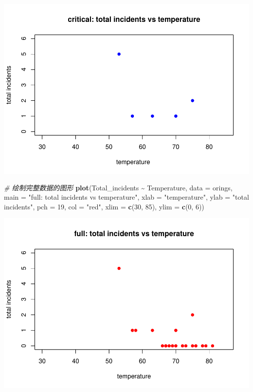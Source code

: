 \documentclass[
]{article}
\newenvironment{Shaded}{\begin{snugshade}}{\end{snugshade}}
\newcommand{\AttributeTok}[1]{\textcolor[rgb]{0.13,0.29,0.53}{#1}}
\newcommand{\CommentTok}[1]{\textcolor[rgb]{0.56,0.35,0.01}{\textit{#1}}}
\newcommand{\DecValTok}[1]{\textcolor[rgb]{0.00,0.00,0.81}{#1}}
\newcommand{\FunctionTok}[1]{\textcolor[rgb]{0.13,0.29,0.53}{\textbf{#1}}}
\newcommand{\NormalTok}[1]{#1}
\newcommand{\SpecialCharTok}[1]{\textcolor[rgb]{0.81,0.36,0.00}{\textbf{#1}}}
\newcommand{\StringTok}[1]{\textcolor[rgb]{0.31,0.60,0.02}{#1}}
\begin{document}
\includegraphics{3220103606-homework1_files/figure-latex/unnamed-chunk-12-1.pdf}

\begin{Shaded}
\begin{Highlighting}[]
\CommentTok{\# 绘制完整数据的图形}
\FunctionTok{plot}\NormalTok{(Total\_incidents }\SpecialCharTok{\textasciitilde{}}\NormalTok{ Temperature, }
     \AttributeTok{data =}\NormalTok{ orings,}
     \AttributeTok{main =} \StringTok{"full: total incidents vs temperature"}\NormalTok{,}
     \AttributeTok{xlab =} \StringTok{"temperature"}\NormalTok{, }
     \AttributeTok{ylab =} \StringTok{"total incidents"}\NormalTok{,}
     \AttributeTok{pch =} \DecValTok{19}\NormalTok{, }\AttributeTok{col =} \StringTok{"red"}\NormalTok{,}
     \AttributeTok{xlim =} \FunctionTok{c}\NormalTok{(}\DecValTok{30}\NormalTok{, }\DecValTok{85}\NormalTok{), }\AttributeTok{ylim =} \FunctionTok{c}\NormalTok{(}\DecValTok{0}\NormalTok{, }\DecValTok{6}\NormalTok{))}
\end{Highlighting}
\end{Shaded}

\includegraphics{3220103606-homework1_files/figure-latex/unnamed-chunk-12-2.pdf}
\end{document}
